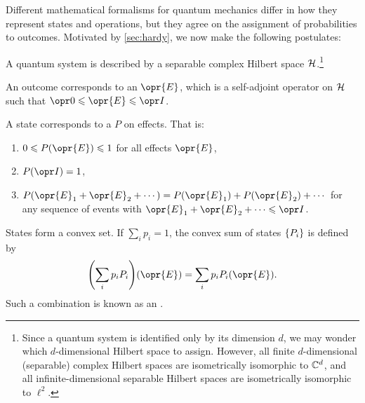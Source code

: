 \documentclass[../thesis.tex]{subfiles}
\begin{document}
Different mathematical formalisms for quantum mechanics differ in how they
represent states and operations, but they agree on the assignment of
probabilities to outcomes. Motivated by \cref{sec:hardy}, we now make the
following postulates:
\begin{post}\label{post:hilb}
  A quantum system is described by a separable complex Hilbert space
  $\mathcal{H}$.\footnote{%
    Since a quantum system is identified only by its dimension $d$, we may
    wonder which $d$-dimensional Hilbert space to assign. However, all finite
    $d$-dimensional (separable) complex Hilbert spaces are isometrically
    isomorphic to $\mathbb{C}^d$, and all infinite-dimensional separable Hilbert spaces
    are isometrically isomorphic to $\ell^2$.
  }
\end{post}

\begin{post}\label{post:effects}
  An outcome corresponds to an  $\opr{E}$, which is a self-adjoint
  operator on $\mathcal{H}$ such that $\zopr \le \opr{E} \le \idopr$.\footnotemark%
\end{post}

\begin{post}\label{post:probability_measure}
  A state corresponds to a  $P$ on effects. That is:
  \begin{enumerate}
    \item $0 \le P(\opr{E}) \le 1$ for all effects $\opr{E}$,
    \item $P(\idopr) = 1$,
    \item $P(\opr{E}_1 + \opr{E}_2 + \cdots) = P(\opr{E}_1) + P(\opr{E}_2)
      + \cdots$ for any sequence of events with $\opr{E}_1 + \opr{E}_2 + \cdots
      \le \idopr$.
  \end{enumerate}
\end{post}

\begin{post}\label{post:convex}
  States form a convex set. If $\sum_i p_i = 1$, the convex sum of states
  $\qty{P_i}$ is defined by
  \begin{equation}
    \qty(\sum_i p_i P_i)(\opr{E})
    = \sum_i p_i P_i(\opr{E}).
    \label{eq:convex}
  \end{equation}
  Such a combination is known as an .
\end{post}
\end{document}
